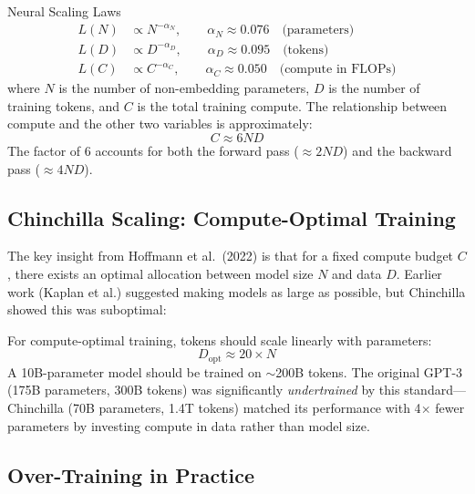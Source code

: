 \begin{mathresult}{Neural Scaling Laws}
\begin{align}
L(N) &\propto N^{-\alpha_N}, \qquad \alpha_N \approx 0.076
    \quad \text{(parameters)} \label{eq:scale_n} \\[4pt]
L(D) &\propto D^{-\alpha_D}, \qquad \alpha_D \approx 0.095
    \quad \text{(tokens)} \label{eq:scale_d} \\[4pt]
L(C) &\propto C^{-\alpha_C}, \qquad \alpha_C \approx 0.050
    \quad \text{(compute in FLOPs)} \label{eq:scale_c}
\end{align}
where $N$ is the number of non-embedding parameters, $D$ is the number of
training tokens, and $C$ is the total training compute.  The relationship
between compute and the other two variables is approximately:
\begin{equation}
C \approx 6ND
\label{eq:flops}
\end{equation}
The factor of 6 accounts for both the forward pass ($\approx 2ND$) and the
backward pass ($\approx 4ND$).
\end{mathresult}

\subsection{Chinchilla Scaling: Compute-Optimal Training}

The key insight from Hoffmann et al.\ (2022) is that for a fixed compute
budget $C$, there exists an optimal allocation between model size $N$ and
data $D$.  Earlier work (Kaplan et al.) suggested making models as large
as possible, but Chinchilla showed this was suboptimal:

\begin{keyinsight}
For compute-optimal training, tokens should scale linearly with parameters:
\[
D_{\text{opt}} \approx 20 \times N
\]
A 10B-parameter model should be trained on $\sim$200B tokens.  The original
GPT-3 (175B parameters, 300B tokens) was significantly \emph{undertrained}
by this standard---Chinchilla (70B parameters, 1.4T tokens) matched its
performance with 4$\times$ fewer parameters by investing compute in data
rather than model size.
\end{keyinsight}

\subsection{Over-Training in Practice}

